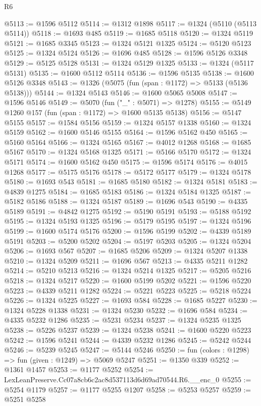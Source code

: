 \begin{lexlean}{R6}
\begin{coremodule}
@5113 := @1596 @5112
@5114 := @1312 @1898
@5117 := @1324 (@5110 (@5113 @5114))
@5118 := @1693 @485
@5119 := @1685 @5118
@5120 := @1324 @5119
@5121 := @1685 @3345
@5123 := @1324 @5121 @1325
@5124 := @5120 @5123
@5125 := @1324 @5124
@5126 := @1696 @485
@5128 := @1596 @5126 @3348
@5129 := @5125 @5128
@5131 := @1324 @5129 @1325
@5133 := @1324 (@5117 @5131)
@5135 := @1600 @5112 @5114
@5136 := @1596 @5135
@5138 := @1600 @5126 @3348
@5143 := @1326 (@5075 (fun (span : @1172) => @5133 (@5136 @5138)))
@5144 := @1324 @5143
@5146 := @1600 @5065 @5008
@5147 := @1596 @5146
@5149 := @5070 (fun ("_" : @5071) => @1278)
@5155 := @5149 @1260 @157 (fun (span : @1172) => @1600 @5135 @5138)
@5156 := @5147 @5155
@5157 := @1584 @5156
@5159 := @1324 @5157 @1338
@5160 := @1324 @5159
@5162 := @1600 @5146 @5155
@5164 := @1596 @5162 @450
@5165 := @5160 @5164
@5166 := @1324 @5165
@5167 := @4012 @1268
@5168 := @1685 @5167
@5170 := @1324 @5168 @1325
@5171 := @5166 @5170
@5172 := @1324 @5171
@5174 := @1600 @5162 @450
@5175 := @1596 @5174
@5176 := @4015 @1268
@5177 := @5175 @5176
@5178 := @5172 @5177
@5179 := @1324 @5178
@5180 := @1693 @543
@5181 := @1685 @5180
@5182 := @1324 @5181
@5183 := @4839 @1275
@5184 := @1685 @5183
@5186 := @1324 @5184 @1325
@5187 := @5182 @5186
@5188 := @1324 @5187
@5189 := @1696 @543
@5190 := @4335 @5189
@5191 := @4842 @1275
@5192 := @5190 @5191
@5193 := @5188 @5192
@5195 := @1324 @5193 @1325
@5196 := @5179 @5195
@5197 := @1324 @5196
@5199 := @1600 @5174 @5176
@5200 := @1596 @5199
@5202 := @4339 @5189 @5191
@5203 := @5200 @5202
@5204 := @5197 @5203
@5205 := @1324 @5204
@5206 := @1693 @567
@5207 := @1685 @5206
@5209 := @1324 @5207 @1338
@5210 := @1324 @5209
@5211 := @1696 @567
@5213 := @4335 @5211 @1282
@5214 := @5210 @5213
@5216 := @1324 @5214 @1325
@5217 := @5205 @5216
@5218 := @1324 @5217
@5220 := @1600 @5199 @5202
@5221 := @1596 @5220
@5223 := @4339 @5211 @1282
@5224 := @5221 @5223
@5225 := @5218 @5224
@5226 := @1324 @5225
@5227 := @1693 @584
@5228 := @1685 @5227
@5230 := @1324 @5228 @1338
@5231 := @1324 @5230
@5232 := @1696 @584
@5234 := @4335 @5232 @1286
@5235 := @5231 @5234
@5237 := @1324 @5235 @1325
@5238 := @5226 @5237
@5239 := @1324 @5238
@5241 := @1600 @5220 @5223
@5242 := @1596 @5241
@5244 := @4339 @5232 @1286
@5245 := @5242 @5244
@5246 := @5239 @5245
@5247 := @5144 @5246
@5250 := fun (colors : @1298) => fun (given : @1249) => @5069 @5247
@5251 := @1350 @339
@5252 := @1361 @1457
@5253 := @1177 @5252
@5254 := LexLeanPreserve.Cc07a8cb6c2ac8d537113d6d69ad70544.R6.__enc_0
@5255 := @5254 @1179
@5257 := @1177 @5255 @1207
@5258 := @5253 @5257
@5259 := @5251 @5258

\end{coremodule}
\end{lexlean}
